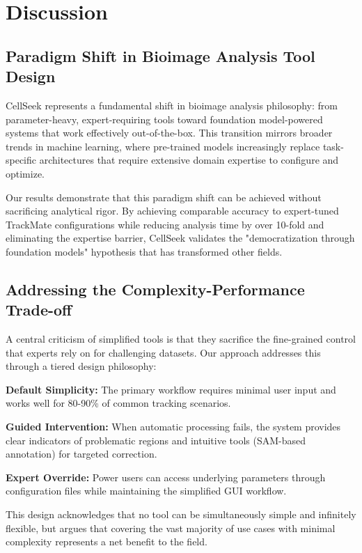\documentclass[../cellseek_paper.tex]{subfiles}
\begin{document}
\section{Discussion}

\subsection{Paradigm Shift in Bioimage Analysis Tool Design}

CellSeek represents a fundamental shift in bioimage analysis philosophy: from parameter-heavy, expert-requiring tools toward foundation model-powered systems that work effectively out-of-the-box. This transition mirrors broader trends in machine learning, where pre-trained models increasingly replace task-specific architectures that require extensive domain expertise to configure and optimize.

Our results demonstrate that this paradigm shift can be achieved without sacrificing analytical rigor. By achieving comparable accuracy to expert-tuned TrackMate \cite{tinevez2017trackmate} configurations while reducing analysis time by over 10-fold and eliminating the expertise barrier, CellSeek validates the "democratization through foundation models" hypothesis that has transformed other fields.

\subsection{Addressing the Complexity-Performance Trade-off}

A central criticism of simplified tools is that they sacrifice the fine-grained control that experts rely on for challenging datasets. Our approach addresses this through a tiered design philosophy:

\textbf{Default Simplicity:} The primary workflow requires minimal user input and works well for 80-90\% of common tracking scenarios.

\textbf{Guided Intervention:} When automatic processing fails, the system provides clear indicators of problematic regions and intuitive tools (SAM-based annotation) for targeted correction.

\textbf{Expert Override:} Power users can access underlying parameters through configuration files while maintaining the simplified GUI workflow.

This design acknowledges that no tool can be simultaneously simple and infinitely flexible, but argues that covering the vast majority of use cases with minimal complexity represents a net benefit to the field.
\end{document}
